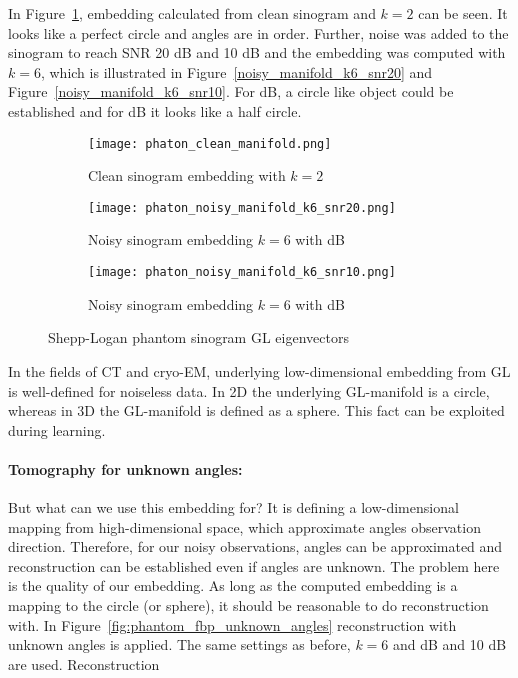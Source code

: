 In Figure~\ref{fig:clean_manifold}, embedding calculated from clean sinogram and $k=2$ can be seen.
It looks like a perfect circle and angles are in order. 
Further, noise was added to the sinogram to reach SNR 20 dB and 10 dB and the embedding was computed with $k=6$, 
which is illustrated in Figure~\ref{noisy_manifold_k6_snr20} and Figure~\ref{noisy_manifold_k6_snr10}.
For  dB, a circle like object could be established and for  dB it looks like a half circle. 

\begin{figure}[H]
    \captionsetup[subfigure]{justification=centering}
    \centering
    \begin{subfigure}[t]{0.3\textwidth}
        \texttt{[image: phaton\_clean\_manifold.png]}
        \caption{Clean sinogram embedding with $k=2$}
        \label{fig:clean_manifold}
    \end{subfigure}\hfill
    \begin{subfigure}[t]{0.3\textwidth}
      \texttt{[image: phaton\_noisy\_manifold\_k6\_snr20.png]}
      \caption{Noisy sinogram embedding $k=6$ with  dB}
      \label{fig:noisy_manifold_k6_snr20}
    \end{subfigure}\hfill
    \begin{subfigure}[t]{0.3\textwidth}
      \texttt{[image: phaton\_noisy\_manifold\_k6\_snr10.png]}
      \caption{Noisy sinogram embedding $k=6$ with  dB}
      \label{fig:noisy_manifold_k6_snr10}
    \end{subfigure}
    \caption{Shepp-Logan phantom sinogram GL eigenvectors}
    \label{fig:phantom_manifolds}
  \end{figure}

\begin{tcolorbox}[colback=red!5!white,colframe=red!75!black]
    In the fields of CT and cryo-EM, underlying low-dimensional embedding from GL is well-defined for noiseless data.
    In 2D the underlying GL-manifold is a circle, whereas in 3D the GL-manifold is defined as a sphere.
    This fact can be exploited during learning.
\end{tcolorbox}

\paragraph{Tomography for unknown angles:}
But what can we use this embedding for?
It is defining a low-dimensional mapping from high-dimensional space, which approximate angles observation direction.
Therefore, for our noisy observations, angles can be approximated and reconstruction can be established even if angles are unknown.
The problem here is the quality of our embedding. As long as the computed embedding is a mapping to the circle (or sphere),
it should be reasonable to do reconstruction with.
In Figure~\ref{fig:phantom_fbp_unknown_angles} reconstruction with unknown angles is applied. The same settings as before, $k=6$
and  dB and 10 dB are used. Reconstruction


